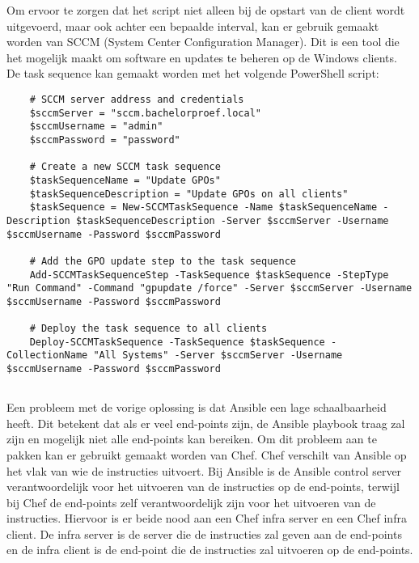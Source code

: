 Om ervoor te zorgen dat het script niet alleen bij de opstart van de client wordt uitgevoerd, maar ook achter een bepaalde interval, kan er gebruik gemaakt worden van SCCM (System Center Configuration Manager). Dit is een tool die het mogelijk maakt om software en updates te beheren op de Windows clients.
De task sequence kan gemaakt worden met het volgende PowerShell script:
\begin{verbatim}
    # SCCM server address and credentials
    $sccmServer = "sccm.bachelorproef.local"
    $sccmUsername = "admin"
    $sccmPassword = "password"

    # Create a new SCCM task sequence
    $taskSequenceName = "Update GPOs"
    $taskSequenceDescription = "Update GPOs on all clients"
    $taskSequence = New-SCCMTaskSequence -Name $taskSequenceName -Description $taskSequenceDescription -Server $sccmServer -Username $sccmUsername -Password $sccmPassword

    # Add the GPO update step to the task sequence
    Add-SCCMTaskSequenceStep -TaskSequence $taskSequence -StepType "Run Command" -Command "gpupdate /force" -Server $sccmServer -Username $sccmUsername -Password $sccmPassword

    # Deploy the task sequence to all clients
    Deploy-SCCMTaskSequence -TaskSequence $taskSequence -CollectionName "All Systems" -Server $sccmServer -Username $sccmUsername -Password $sccmPassword
\end{verbatim}

\subsection{}
\label{subsec:Oplossing_voor_Linux_end-points_met_Chef_en_Vault}
Een probleem met de vorige oplossing is dat Ansible een lage schaalbaarheid heeft. Dit betekent dat als er veel end-points zijn, de Ansible playbook traag zal zijn en mogelijk niet alle end-points kan bereiken.
Om dit probleem aan te pakken kan er gebruikt gemaakt worden van Chef. Chef verschilt van Ansible op het vlak van wie de instructies uitvoert. Bij Ansible is de Ansible control server verantwoordelijk voor het uitvoeren van de instructies op de end-points, terwijl bij Chef de end-points zelf verantwoordelijk zijn voor het uitvoeren van de instructies.
Hiervoor is er beide nood aan een Chef infra server en een Chef infra client. De infra server is de server die de instructies zal geven aan de end-points en de infra client is de end-point die de instructies zal uitvoeren op de end-points. \\

